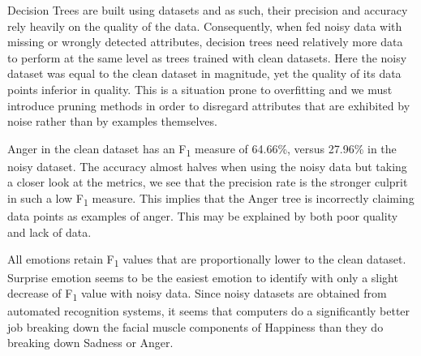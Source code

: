 Decision Trees are built using datasets and as such, their precision and accuracy rely heavily on the quality of the data.
Consequently, when fed noisy data with missing or wrongly detected attributes, decision trees need relatively more data to
perform at the same level as trees trained with clean datasets. Here the noisy dataset was equal to the clean dataset in magnitude, yet the quality of its data points
inferior in quality. This is a situation prone to overfitting and we must introduce pruning methods in order to disregard attributes
that are exhibited by noise rather than by examples themselves.

Anger in the clean dataset has an F\textsubscript{1} measure of 64.66\%, versus 27.96\% in the noisy dataset.
The accuracy almost halves when using the noisy data but taking a closer look at the metrics, we see that the precision
rate is the stronger culprit in such a low F\textsubscript{1} measure. This implies that the Anger tree is incorrectly claiming
data points as examples of anger. This may be explained by both poor quality and lack of data.

\newpage
All emotions retain F\textsubscript{1} values that are proportionally lower to the clean dataset. 
Surprise emotion seems to be the easiest emotion to identify with only a slight decrease of F\textsubscript{1} value with noisy data.
Since noisy datasets are obtained from automated recognition systems, it seems that computers do a significantly better job
breaking down the facial muscle components of Happiness than they do breaking down Sadness or Anger. 
